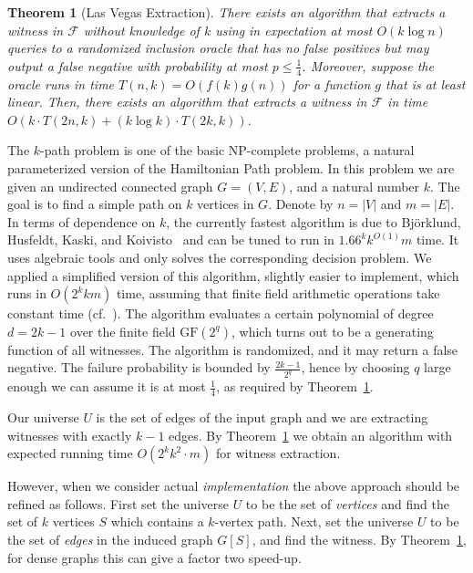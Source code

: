 \documentclass[11pt]{article}
\newtheorem{theorem}{Theorem}[]
\newcommand{\field}[1]{{\textrm{GF}}({#1})}
\newcommand{\headingnsp}[1]{\noindent{\bf #1.\ }}\newcommand{\heading}[1]{\medskip\noindent{\bf #1.\ }}
\begin{document}
\begin{theorem}[Las Vegas Extraction]
\label{thm:main-randomized}
There exists an algorithm that extracts a witness in $\mathcal{F}$ 
without knowledge of $k$ using in expectation at most 
$O(k\log n)$ queries to a randomized inclusion oracle that has no 
false positives but may output a false negative with probability at most 
$p\leq \frac{1}4$. Moreover, suppose the oracle runs in time $T(n,k)=O(f(k)g(n))$ 
for a function $g$ that is at least linear. Then, there exists an algorithm 
that extracts a witness in $\mathcal{F}$ in 
time $O(k\cdot T(2n,k)+(k\log k)\cdot T(2k,k))$. 
\end{theorem}

\headingnsp{An Application: $k$-Path}
The $k$-path problem is one of the basic NP-complete problems, a natural parameterized version of the Hamiltonian Path problem.
In this problem we are given an undirected connected graph $G = (V, E)$, and a natural number $k$. 
The goal is to find a simple path on $k$ vertices in $G$. 
Denote by $n=|V|$ and $m=|E|$.
In terms of dependence on $k$, the currently fastest algorithm is due to Bj\"orklund, Husfeldt, Kaski, and Koivisto~\cite{BjorklundHusfeldtKaskiKoivisto2010} and can be tuned to run in $1.66^kk^{O(1)}m$ time.
It uses algebraic tools and only solves the corresponding decision problem.
We applied a simplified version of this algorithm, slightly easier to implement, which runs in $O(2^kkm)$ time, assuming that finite field arithmetic operations take constant time (cf.~\cite{fpt-textbook}). 
The algorithm evaluates a certain polynomial of degree $d=2k-1$ over the finite field $\field{2^q}$, which turns out to be a generating function of all witnesses. The algorithm is randomized, and it may return a false negative. The failure probability is bounded by $\frac{2k-1}{2^q}$, hence by choosing $q$ large enough we can assume it is at most $\frac{1}4$, as required by Theorem~\ref{thm:main-randomized}.

Our universe $U$ is the set of edges of the input graph and we are extracting witnesses with exactly $k-1$ edges. 
By Theorem~\ref{thm:main-randomized} we obtain an algorithm with expected running time $O(2^kk^2\cdot m)$ for witness extraction.

However, when we consider actual {\em implementation} the above approach should be refined as follows.
First set the universe $U$ to be the set of {\em vertices} and find the set of $k$ vertices $S$ which contains a $k$-vertex path.
Next, set the universe $U$ to be the set of {\em edges} in the induced graph $G[S]$, and find the witness. 
By Theorem~\ref{thm:main-randomized}, for dense graphs this can give a factor two speed-up.
\end{document}
